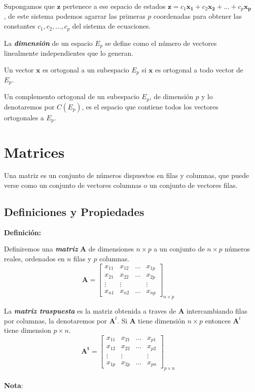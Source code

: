 \documentclass[12pt,letterpaper]{report} %
\begin{document}
Supongamos que $\mathbf{z}$ pertenece a ese espacio de estados $\mathbf{z}=c_1\mathbf{x_1}+c_2\mathbf{x_2}+...+c_p\mathbf{x_p}$, de este sistema podemos agarrar las primeras $p$ coordenadas para obtener las constantes $c_1,c_2,...,c_p$ del sistema de ecuaciones.

La \textit{\textbf{dimensión}} de un espacio $E_p$ se define como el número de vectores linealmente independientes que lo generan.

Un vector $\mathbf{x}$ es ortogonal a un subespacio $E_p$ si $\mathbf{x}$ es ortogonal a todo vector de $E_p$.

Un complemento ortogonal de un subespacio $E_p$, de dimensión $p$ y lo denotaremos por $C(E_p)$, es el espacio que contiene todos los vectores ortogonales a $E_p$.

\section{Matrices}

Una matriz es un conjunto de números dispuestos en filas y columnas, que puede verse como un conjunto de vectores columnas o un conjunto de vectores filas.

\subsection{Definiciones y Propiedades}

\textbf{Definición:}

Definiremos una \textit{\textbf{matriz}} $\mathbf{A}$ de dimensiones $n \times p$ a un conjunto de $n \times p$ números reales, ordenados en $n$ filas y $p$ columnas.
$$
\mathbf{A}=\begin{bmatrix}
x_{11} & x_{12} & ... & x_{1p} \\
x_{21} & x_{22} & ... & x_{2p} \\
\vdots & \vdots &   & \vdots \\
x_{n1} & x_{n2} & ... & x_{np} 
\end{bmatrix}_{n\times p}
$$

La \textit{\textbf{matriz traspuesta}} es la matriz obtenida a traves de $\mathbf{A}$ intercambiando filas por columnas, la denotaremos por $\mathbf{A}^t$. Si $\mathbf{A}$ tiene dimensión $n \times p$ entonces $\mathbf{A}^t$ tiene dimension $p \times n$. 
$$
\mathbf{A^t}=\begin{bmatrix}
x_{11} & x_{21} & ... & x_{p1} \\
x_{12} & x_{22} & ... & x_{p2} \\
\vdots & \vdots &   & \vdots \\
x_{1p} & x_{2p} & ... & x_{pn} 
\end{bmatrix}_{p\times n}
$$
\\
\textbf{Nota}:
\end{document}
